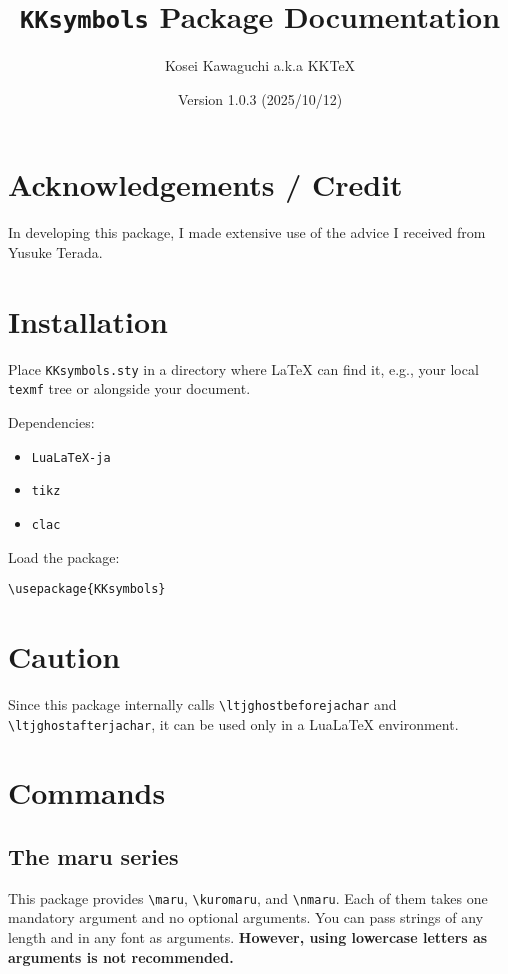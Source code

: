 \documentclass[luatex,fontsize=10pt,paper=b5,twoside]{jlreq}%
\title{\texttt{KKsymbols} Package Documentation}
\author{Kosei Kawaguchi a.k.a KKTeX}
\date{Version 1.0.3 (2025/10/12)}
\begin{document}
\begin{titlepage}
  \maketitle
\end{titlepage}
\newpage
\tableofcontents
\newpage

\section{Acknowledgements / Credit}
In developing this package, I made extensive use of the advice I received from Yusuke Terada.

\section{Installation}
Place \texttt{KKsymbols.sty} in a directory where LaTeX can find it, e.g., your local \texttt{texmf} tree or alongside your document.

Dependencies:
\begin{itemize}
    \item \texttt{LuaLaTeX-ja}
    \item \texttt{tikz}
    \item \texttt{clac}
\end{itemize}

Load the package:

\begin{verbatim}
\usepackage{KKsymbols}
\end{verbatim}

\section{Caution}
Since this package internally calls \verb|\ltjghostbeforejachar| and \verb|\ltjghostafterjachar|, it can be used only in a LuaLaTeX environment.

\section{Commands}
\subsection{The maru series}
This package provides \verb|\maru|, \verb|\kuromaru|, and \verb|\nmaru|. Each of them takes one mandatory argument and no optional arguments. You can pass strings of any length and in any font as arguments. \textbf{However, using lowercase letters as arguments is not recommended.}
\end{document}
